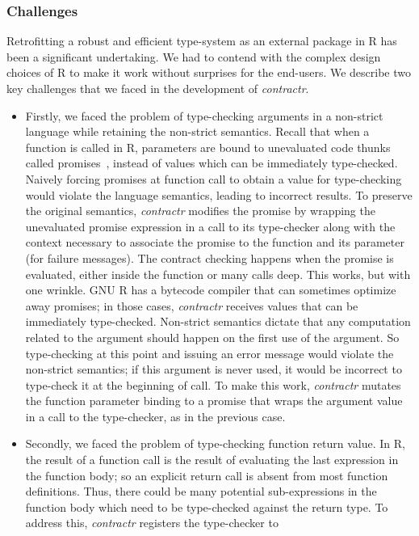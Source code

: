 \documentclass[acmsmall,review,anonymous]{acmart}\settopmatter{printfolios=true,printccs=false,printacmref=false}
\newcommand{\contractr}{\emph{contractr}\xspace} %
\begin{document}
\subsubsection{Challenges}
Retrofitting a robust and efficient type-system as an external package in R has
been a significant undertaking. We had to contend with the complex design
choices of R to make it work without surprises for the end-users. We describe
two key challenges that we faced in the development of \contractr.
\begin{itemize}
\item Firstly, we faced the problem of type-checking arguments in a
  non-strict language while retaining the non-strict semantics. Recall that when a
  function is called in R, parameters are bound to unevaluated code thunks
  called promises~\cite{oopsla19}, instead of values which can be
  immediately type-checked. Naively forcing promises at function call to
  obtain a value for type-checking would violate the language semantics,
  leading to incorrect results. To preserve the original semantics,
  \contractr modifies the promise by wrapping the unevaluated promise
  expression in a call to its type-checker along with the context necessary
  to associate the promise to the function and its parameter (for failure
  messages). The contract checking happens when the promise is evaluated,
  either inside the function or many calls deep.  This works, but with one
  wrinkle. GNU R has a bytecode compiler that can sometimes optimize away
  promises; in those cases, \contractr receives values that can be
  immediately type-checked. Non-strict semantics dictate that any
  computation related to the argument should happen on the first use of the
  argument. So type-checking at this point and issuing an error message
  would violate the non-strict semantics; if this argument is never used, it
  would be incorrect to type-check it at the beginning of call. To make this
  work, \contractr mutates the function parameter binding to a promise that
  wraps the argument value in a call to the type-checker, as in the previous
  case.
\item Secondly, we faced the problem of type-checking function return
  value. In R, the result of a function call is the result of evaluating the
  last expression in the function body; so an explicit return call is absent
  from most function definitions. Thus, there could be many potential
  sub-expressions in the function body which need to be type-checked against
  the return type. To address this, \contractr registers the type-checker to

\end{itemize}
\end{document}
